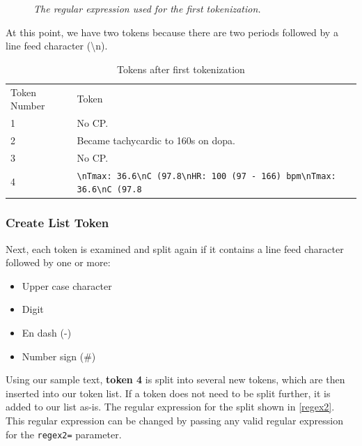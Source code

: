 \documentclass[runningheads,a4paper]{llncs}
\begin{document}
\begin{figure}
 \caption {\emph{The regular expression used for the first tokenization.}}
 \label{regex1}
\end{figure}

\noindent At this point, we have two tokens because there are two periods followed by a line feed character  (\textbackslash{}n).

\medskip\noindent%
\begin{table}
\caption{Tokens after first tokenization}
\begin{center}
\renewcommand{\arraystretch}{1.4}
\setlength\tabcolsep{3pt}
\begin{tabular}{lll}
\hline\noalign{\smallskip}
Token Number & Token\\
\noalign{\smallskip}
\hline
\noalign{\smallskip}
 1 & No CP.\\
 2 & Became tachycardic to 160s on dopa. \\
3 & No CP. \\
4 & \verb|\nTmax: 36.6\nC (97.8\nHR: 100 (97 - 166) bpm\nTmax: 36.6\nC (97.8| \\

\hline
\end{tabular}
\end{center}
\end{table}

\subsubsection{Create List Token}
\noindent Next, each token is examined and split again if it contains a line feed character followed by one or more:

\begin{itemize}
\item
Upper case character
\item
Digit
\item
En dash (-)
\item
Number sign (\#)  
\end{itemize}


\noindent Using our sample text, \textbf{token 4} is split into several new tokens, which are then inserted into our token list. If a token does not need to be split further, it is added to our list as-is. The regular expression for the split shown in \ref{regex2}. This regular expression can be changed by passing any valid regular expression for the \verb|regex2=| parameter.
\end{document}

